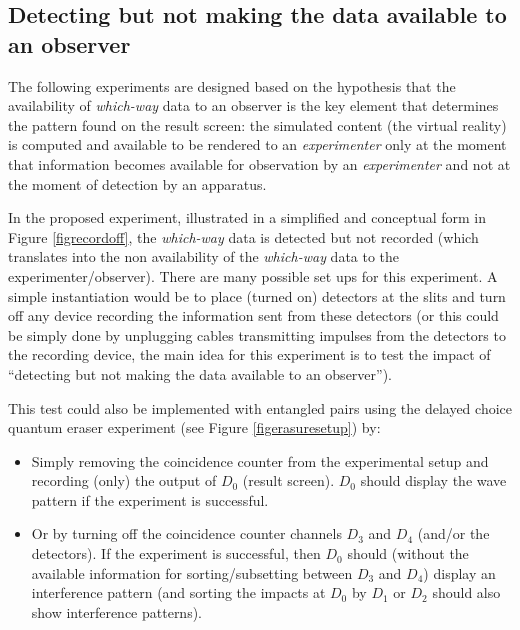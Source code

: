 \documentclass[11pt]{article}
\theoremstyle{definition}
\begin{document}
\subsection{Detecting but not making the data available to  an observer}\label{secpredict2}
The following experiments are designed based on the hypothesis that the availability of  \emph{which-way} data to an observer is the key element that determines the pattern found on the result screen: the simulated content (the virtual reality) is computed and available to be rendered to an \emph{experimenter}
only at the moment that information becomes available for observation by an \emph{experimenter} and not at the moment of detection by an apparatus.

In the proposed experiment, illustrated in a simplified and conceptual form in Figure \ref{figrecordoff}, the \emph{which-way} data is detected but not recorded (which translates into the non availability of the \emph{which-way} data to the experimenter/observer).
There are many possible set ups for this experiment. A simple instantiation would be to place (turned on) detectors  at the slits and turn off any  device recording the information sent from these detectors (or this could be simply done by unplugging cables transmitting impulses from the detectors to the recording device, the main idea for this experiment is to test the impact of ``detecting but not making the data available to an observer'').


This test could also be implemented with entangled pairs using the delayed choice quantum eraser experiment (see Figure \ref{figerasuresetup})
 by:
 \begin{itemize}
\item Simply removing the coincidence counter from the experimental setup and recording (only) the output of $D_0$ (result screen).  $D_0$ should display the wave pattern if the experiment is successful.
\item Or by turning off the coincidence counter channels $D_3$ and $D_4$ (and/or the detectors). If the experiment is successful, then $D_0$ should (without the available information for sorting/subsetting between $D_3$ and $D_4$) display an interference pattern (and sorting the impacts at $D_0$ by $D_1$ or $D_2$ should also show interference patterns).
\end{itemize}
\end{document}
